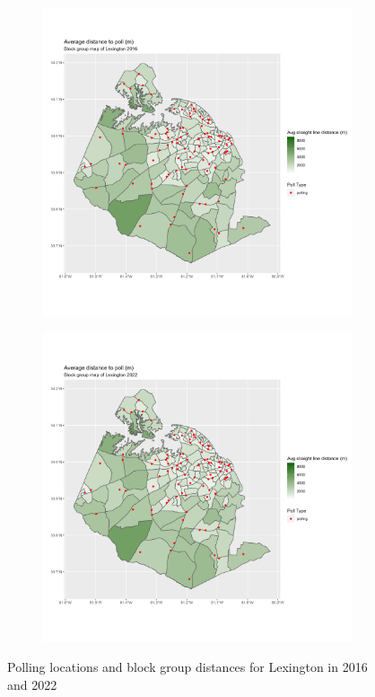 \documentclass[11pt]{article}
\theoremstyle{remark}
\theoremstyle{definition}
\begin{document}
\begin{figure}
	\begin{subfigure}{.5\textwidth}
		\centering
		\includegraphics[width=\linewidth]{result analysis/Lexington_SC_original_configs/distance_map_Lexington_config_original_2016_polls.png}
		\label{sfig:York_2016_bg_dist}
	\end{subfigure} 
	\begin{subfigure}{.5\textwidth}
		\centering
		\includegraphics[width=\linewidth]{result analysis/Lexington_SC_original_configs/distance_map_Lexington_config_original_2022_polls.png}
		\label{sfig:Lexington_2022_bg_dist}
	\end{subfigure}
	\caption{Polling locations and block group distances for Lexington in 2016 and 2022}
	\label{fig:Lexington distance maps}
\end{figure}
\end{document}
